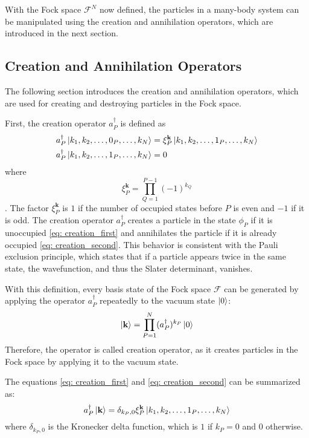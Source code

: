 With the Fock space $\mathcal{F}^N$ now defined, the particles in a many-body system can be manipulated using the creation and annihilation operators, which are introduced in the next section.

\subsection{Creation and Annihilation Operators}

The following section introduces the creation and annihilation operators, which are used for creating and destroying particles in the Fock space.

First, the creation operator $a_P^{\dagger}$ is defined as
\begin{align}
    a_P^{\dagger} \ket{k_1, k_2, \ldots, 0_P, \ldots, k_N} &= \xi_P^{\mathbf{k}} \ket{k_1, k_2, \ldots, 1_P, \ldots, k_N} \label{eq: creation_first} \\
    a_P^{\dagger} \ket{k_1, k_2, \ldots, 1_P, \ldots, k_N} &= 0 \label{eq: creation_second}
\end{align}
where 
\begin{equation}
    \xi_P^{\mathbf{k}} = \prod_{Q=1}^{P-1} (-1)^{k_Q}
\end{equation}
\cite{Altland, Helgaker2000}. The factor $\xi_P^{\textbf{k}}$ is $1$ if the number of occupied states before $P$ is even and $-1$ if it is odd. The creation operator $a_P^{\dagger}$ creates a particle in the state $\phi_P$ if it is unoccupied \eqref{eq: creation_first} and annihilates the particle if it is already occupied \eqref{eq: creation_second}. This behavior is consistent with the Pauli exclusion principle, which states that if a particle appears twice in the same state, the wavefunction, and thus the Slater determinant, vanishes.

With this definition, every basis state of the Fock space $\mathcal{F}$ can be generated by applying the operator $a_P^{\dagger}$ repeatedly to the vacuum state $\ket{0}$:
\begin{equation}
    \ket{\mathbf{k}} =\prod_{P=1}^{N} (a_P^{\dagger})^{k_P} \ket{0}
\end{equation}
Therefore, the operator is called creation operator, as it creates particles in the Fock space by applying it to the vacuum state.

The equations \eqref{eq: creation_first} and \eqref{eq: creation_second} can be summarized as:
\begin{equation}
    a_P^{\dagger}\ket{\mathbf{k}} = \delta_{k_P, 0} \xi_P^{\mathbf{k}} \ket{k_1, k_2, \ldots, 1_P, \ldots, k_N} \label{eq: creation_operator}
\end{equation}
where $\delta_{k_P, 0}$ is the Kronecker delta function, which is $1$ if $k_P = 0$ and $0$ otherwise.

